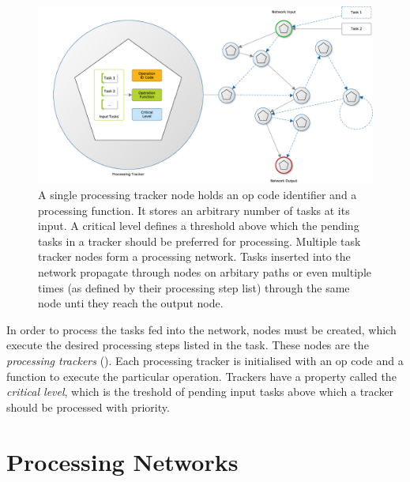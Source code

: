 \begin{figure}%
\begin{center}
	\includegraphics[width=1.0\columnwidth]{images/task_network}
	\caption{A single processing tracker node holds an op code identifier
		and a processing function. It stores an arbitrary number of
		tasks at its input. A critical level defines a threshold above
		which the pending tasks in a tracker should be preferred for
		processing. Multiple task tracker nodes form a processing
		network. Tasks inserted into the network propagate through
		nodes on arbitary paths or even multiple times (as defined by
		their processing step list) through the same node unti they
		reach the output node.}
	\label{fig:task_network}
\end{center}
\end{figure}

In order to process the tasks fed into the network, nodes must be created,
which execute the desired processing steps listed in the task.  These nodes are
the \emph{processing trackers} (). Each processing
tracker is initialised with an op code and a function to execute the particular
operation. Trackers have a property called the \emph{critical level}, which is
the treshold of pending input tasks above which a tracker should be processed
with priority.


\section{Processing Networks}


